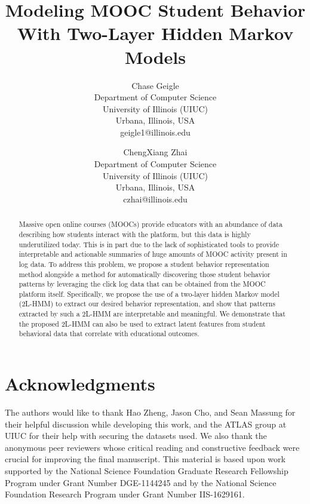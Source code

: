 \documentclass[a4,notitlepage,12pt]{jedm}
\begin{document}
\title{Modeling MOOC Student Behavior With Two-Layer Hidden Markov Models}

\author{%
  {\large Chase Geigle}\\Department of Computer Science\\University
  of Illinois (UIUC)\\Urbana, Illinois,
  USA\\geigle1@illinois.edu
  \and
  {\large ChengXiang Zhai}\\Department of Computer Science\\University of
  Illinois (UIUC)\\Urbana, Illinois, USA\\czhai@illinois.edu}
\date{}

\maketitle

\begin{abstract}
  Massive open online courses (MOOCs) provide educators with an abundance
  of data describing how students interact with the platform, but this data
  is highly underutilized today. This is in part due to the lack of
  sophisticated tools to provide interpretable and actionable summaries of
  huge amounts of MOOC activity present in log data. To address this problem, we
  propose a student behavior representation method alongside a method for
  automatically discovering those student behavior patterns by leveraging
  the click log data that can be obtained from the MOOC platform itself.
  Specifically, we propose the use of a two-layer hidden Markov model
  (2L-HMM) to extract our desired behavior representation, and show that
  patterns extracted by such a 2L-HMM are interpretable and meaningful. We
  demonstrate that the proposed 2L-HMM can also be used to extract latent
  features from student behavioral data that correlate with educational
  outcomes.
\end{abstract}

\newcommand{\NSFGRFP}{This material is based upon work supported by the
National Science Foundation Graduate Research Fellowship Program under
Grant Number DGE-1144245 and by the National Science Foundation Research
Program under Grant Number IIS-1629161.}

\newcommand{\acknowledgments}{The authors would like to thank Hao Zheng,
Jason Cho, and Sean Massung for their helpful discussion while developing
this work, and the ATLAS group at UIUC for their help with securing the
datasets used. We also thank the anonymous peer reviewers whose critical
reading and constructive feedback were crucial for improving the final
manuscript. \NSFGRFP{}}













\section{Acknowledgments}
\acknowledgments{}



\end{document}

